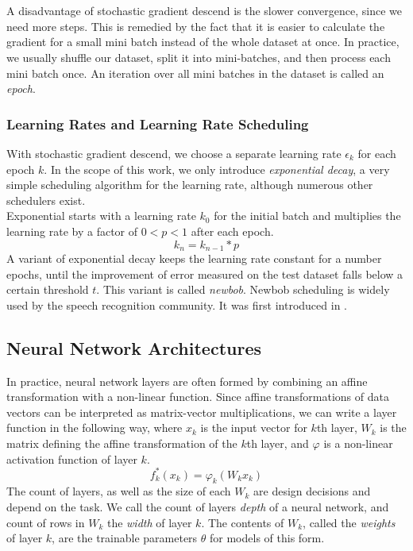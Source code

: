 \\ \\
A disadvantage of stochastic gradient descend is the slower convergence, since we need more steps. This is remedied by the fact that it is easier to calculate the gradient for a small mini batch instead of the whole dataset at once. In practice, we usually shuffle our dataset, split it into mini-batches, and then process each mini batch once. An iteration over all mini batches in the dataset is called an \textit{epoch}. 

\subsubsection{Learning Rates and Learning Rate Scheduling}

With stochastic gradient descend, we choose a separate learning rate $\epsilon_k$ for each epoch $k$. In the scope of this work, we only introduce \textit{exponential decay}, a very simple scheduling algorithm for the learning rate, although numerous other schedulers exist. \\
Exponential starts with a learning rate $k_0$ for the initial batch and multiplies the learning rate by a factor of $0 < p < 1$ after each epoch. 
\[
k_n = k_{n - 1} * p
\]
A variant of exponential decay keeps the learning rate constant for a number epochs, until the improvement of error measured on the test dataset falls below a certain threshold $t$. This variant is called \textit{newbob}. Newbob scheduling is widely used by the speech recognition community. It was first introduced in \cite{berkely2000newbob}.

\subsection{Neural Network Architectures}

In practice, neural network layers are often formed by combining an affine transformation with a non-linear function. Since affine transformations of data vectors can be interpreted as matrix-vector multiplications, we can write a layer function in the following way, where $x_k$ is the input vector for $k$th layer, $W_k$ is the matrix defining the affine transformation of the $k$th layer, and $\varphi$ is a non-linear activation function of layer $k$.
\[
f^*_k(x_k) = \varphi_k(W_k x_k)  
\]
The count of layers, as well as the size of each $W_k$ are design decisions and depend on the task. We call the count of layers \textit{depth} of a neural network, and count of rows in $W_k$ the \textit{width} of layer $k$. The contents of $W_k$, called the \textit{weights} of layer $k$, are the trainable parameters $\theta$ for models of this form.
\pagebreak
